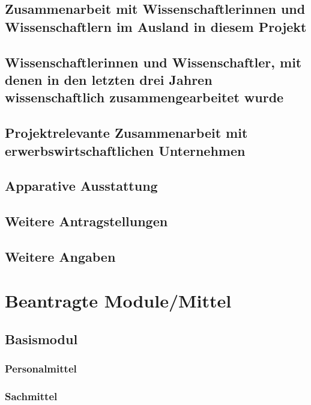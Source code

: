 \documentclass[de]{dfg-proposal}
\begin{document}
        \subsection{Zusammenarbeit mit Wissenschaftlerinnen und Wissenschaftlern im Ausland in diesem Projekt}

        \subsection{Wissenschaftlerinnen und Wissenschaftler, mit denen in den letzten drei Jahren wissenschaftlich zusammengearbeitet wurde}

        \subsection{Projektrelevante Zusammenarbeit mit erwerbswirtschaftlichen Unternehmen}

        \subsection{Apparative Ausstattung}

        \subsection{Weitere Antragstellungen}

        \subsection{Weitere Angaben}


    \section{Beantragte Module/Mittel}\label{sec:beantragte-module/mittel}

        \subsection{Basismodul}

            \subsubsection{Personalmittel}

            \subsubsection{Sachmittel}
\end{document}
